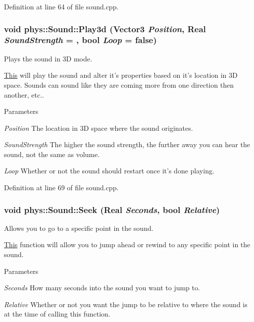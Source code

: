 Definition at line 64 of file sound.cpp.

\hypertarget{classphys_1_1Sound_adbb79c9d1a37bf541bfb259551c6067f}{
\subsubsection[{Play3d}]{\setlength{\rightskip}{0pt plus 5cm}void phys::Sound::Play3d ({\bf Vector3} {\em Position}, \/  {\bf Real} {\em SoundStrength} = {}, \/  bool {\em Loop} = {\ttfamily false})}}
\label{dc/d2f/classphys_1_1Sound_adbb79c9d1a37bf541bfb259551c6067f}


Plays the sound in 3D mode. 

\hyperlink{structThis}{This} will play the sound and alter it's properties based on it's location in 3D space. Sounds can sound like they are coming more from one direction then another, etc.. 
\begin{DoxyParams}{Parameters}
\item[{\em Position}]The location in 3D space where the sound originates. \item[{\em SoundStrength}]The higher the sound strength, the further away you can hear the sound, not the same as volume. \item[{\em Loop}]Whether or not the sound should restart once it's done playing. \end{DoxyParams}


Definition at line 69 of file sound.cpp.

\hypertarget{classphys_1_1Sound_a8dfc3b7e9419a3c50c0ac6ecf6ece096}{
\subsubsection[{Seek}]{\setlength{\rightskip}{0pt plus 5cm}void phys::Sound::Seek ({\bf Real} {\em Seconds}, \/  bool {\em Relative})}}
\label{dc/d2f/classphys_1_1Sound_a8dfc3b7e9419a3c50c0ac6ecf6ece096}


Allows you to go to a specific point in the sound. 

\hyperlink{structThis}{This} function will allow you to jump ahead or rewind to any specific point in the sound. 
\begin{DoxyParams}{Parameters}
\item[{\em Seconds}]How many seconds into the sound you want to jump to. \item[{\em Relative}]Whether or not you want the jump to be relative to where the sound is at the time of calling this function. \end{DoxyParams}


